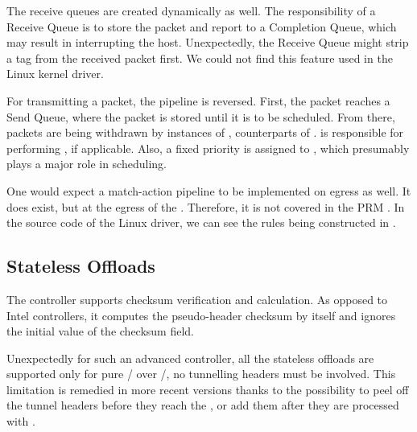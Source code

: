The receive queues are created dynamically as well. The responsibility of a Receive
Queue is to store the packet and report to a Completion Queue, which may result
in interrupting the host. Unexpectedly, the Receive Queue might strip
a  tag from the received packet first. We could not find this
feature used in the Linux kernel driver.

For transmitting a packet, the pipeline is reversed. First, the packet reaches
a Send Queue, where the packet is stored until it is to be scheduled. From
there, packets are being withdrawn by instances of , counterparts of
.  is responsible for performing , if applicable. Also,
a fixed priority is assigned to , which presumably plays a major role in
scheduling.

One would expect a match-action pipeline to be implemented on egress as well.
It does exist, but at the egress of the . Therefore, it is not
covered in the PRM \cite{mlx-prm}. In the source code of the Linux driver, we
can see the rules being constructed in
.

\subsection{Stateless Offloads}

The controller supports checksum verification and calculation. As opposed to
Intel controllers, it computes the pseudo-header checksum by itself and ignores
the initial value of the checksum field.

Unexpectedly for such an advanced controller, all the stateless offloads are
supported only for pure / over /, no tunnelling
headers must be involved. This limitation is remedied in more recent versions
thanks to the possibility to peel off the tunnel headers before they reach the
, or add them after they are processed with .
